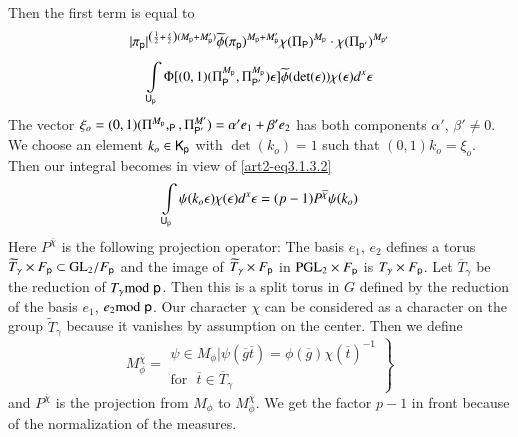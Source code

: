 Then the first term is equal to
\begin{gather*}
|\pi_{\mathsf{p}}|^{\left(\frac{1}{2}+\frac{s}{2}\right)(M_{\mathsf{p}}+M'_{\mathsf{p}})}\widetilde{\phi}(\pi_{\mathsf{p}})^{M_{\mathsf{p}}+M'_{\mathsf{p}}}\chi(\Pi_{\mathsf{P}})^{M_{\mathsf{p}}}\cdot \chi(\Pi_{\mathsf{p}'})^{M_{\mathsf{p}'}}\\[4pt]
\int\limits_{\mathsf{U}_{\mathsf{p}}}\Phi[(0,1)(\Pi^{M_{\mathsf{p}}}_{\mathsf{P}},\Pi^{M_{\mathsf{p}}}_{\mathsf{P}'})\epsilon]\widetilde{\phi}(\det (\epsilon))\chi(\epsilon)d^{x}\epsilon
\end{gather*}
The vector $\xi_{o}=(0,1)(\Pi^{M_{\mathsf{p}}},_{\mathsf{P}},\Pi^{M'}_{\mathsf{P}'})=\alpha'e_{1}+\beta'e_{2}$ has both components $\alpha'$, $\beta'\neq 0$. We choose an element $k_{o}\in \mathsf{K}_{\mathsf{p}}$ with $\det (k_{o})=1$ such that $(0,1)k_{o}=\xi_{o}$. Then our integral becomes in view of \eqref{art2-eq3.1.3.2}
$$
\int\limits_{\mathsf{U}_{\mathsf{p}}}\psi(k_{o}\epsilon)\chi(\epsilon)d^{x}\epsilon=(p-1)P^{\overline{\chi}}\psi(k_{o})
$$
Here $P^{\overline{\chi}}$ is the following projection operator: The basis $e_{1}$, $e_{2}$ defines a torus $\widetilde{T}_{\gamma}\times F_{\mathsf{p}}\subset \mathrm{GL}_{2}/F_{\mathsf{p}}$ and the image of $\widetilde{T}_{\gamma}\times F_{\mathsf{p}}$ in $\mathrm{PGL}_{2}\times F_{\mathsf{p}}$ is $T_{\gamma}\times F_{\mathsf{p}}$. Let $\overline{T}_{\gamma}$ be the reduction of $T_{\gamma}{\rm{mod}}\kern.3em \mathsf{p}$. Then this is a split torus in $G$ defined by the reduction of the basis $e_{1}$, $e_{2}{\rm{mod}}\kern.3em\mathsf{p}$. Our character $\chi$ can be considered as a character on the group $\widetilde{T}_{\gamma}$ because it vanishes by assumption on the center. Then we define
$$
M^{\overline{\chi}}_{\phi}=
\left.
\begin{array}{c}
\psi\in M_{\phi}|\psi(\overline{g}\overline{t})=\phi(\overline{g})\chi(\overline{t})^{-1}\\[4pt]
\text{for~ } \overline{t}\in \overline{T}_{\gamma}
\end{array}
\right\}
$$
and $P^{\overline{\chi}}$ is the projection from $M_{\phi}$ to $M^{\overline{\chi}}_{\phi}$. We get the factor $p-1$ in front because of the normalization of the measures.


